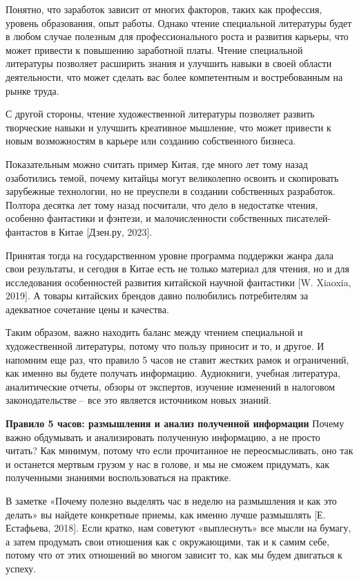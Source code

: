 Понятно, что заработок зависит от многих факторов, таких как профессия, уровень образования, опыт работы. Однако чтение специальной литературы будет в любом случае полезным для профессионального роста и развития карьеры, что может привести к повышению заработной платы. Чтение специальной литературы позволяет расширить знания и улучшить навыки в своей области деятельности, что может сделать вас более компетентным и востребованным на рынке труда.

С другой стороны, чтение художественной литературы позволяет развить творческие навыки и улучшить креативное мышление, что может привести к новым возможностям в карьере или созданию собственного бизнеса.

Показательным можно считать пример Китая, где много лет тому назад озаботились темой, почему китайцы могут великолепно освоить и скопировать зарубежные технологии, но не преуспели в создании собственных разработок. Полтора десятка лет тому назад посчитали, что дело в недостатке чтения, особенно фантастики и фэнтези, и малочисленности собственных писателей-фантастов в Китае [Дзен.ру, 2023].

Принятая тогда на государственном уровне программа поддержки жанра дала свои результаты, и сегодня в Китае есть не только материал для чтения, но и для исследования особенностей развития китайской научной фантастики [W. Xiaoxia, 2019]. А товары китайских брендов давно полюбились потребителям за адекватное сочетание цены и качества.

Таким образом, важно находить баланс между чтением специальной и художественной литературы, потому что пользу приносит и то, и другое. И напомним еще раз, что правило 5 часов не ставит жестких рамок и ограничений, как именно вы будете получать информацию. Аудиокниги, учебная литература, аналитические отчеты, обзоры от экспертов, изучение изменений в налоговом законодательстве – все это является источником новых знаний.

\textbf{Правило 5 часов: размышления и анализ полученной информации}
Почему важно обдумывать и анализировать полученную информацию, а не просто читать? Как минимум, потому что если прочитанное не переосмысливать, оно так и останется мертвым грузом у нас в голове, и мы не сможем придумать, как полученными знаниями воспользоваться на практике.

В заметке «Почему полезно выделять час в неделю на размышления и как это делать» вы найдете конкретные приемы, как именно лучше размышлять [Е. Естафьева, 2018]. Если кратко, нам советуют «выплеснуть» все мысли на бумагу, а затем продумать свои отношения как с окружающими, так и к самим себе, потому что от этих отношений во многом зависит то, как мы будем двигаться к успеху.

